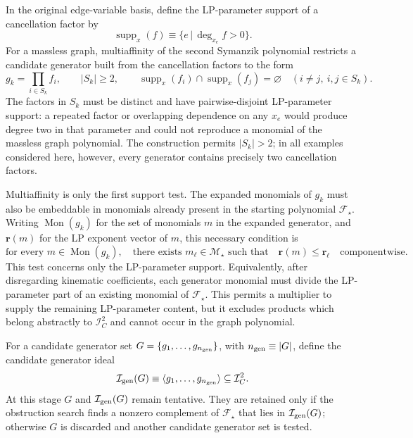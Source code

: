 \documentclass[a4paper,11pt]{article}
\newcommand{\ideal}{\mathcal I}
\begin{document}
In the original edge-variable basis, define the LP-parameter support of a
cancellation factor by
\begin{equation}
 \operatorname{supp}_{x}(f)
 \equiv\bigl\{e\,\big|\,\deg_{x_e}f>0\bigr\}.
 \label{eq:factor-x-support}
\end{equation}
For a massless graph, multiaffinity of the second Symanzik polynomial
restricts a candidate generator built from the cancellation factors to the
form
\begin{equation}
 g_k=\prod_{i\in S_k}f_i,
 \qquad |S_k|\geq2,
 \qquad
 \operatorname{supp}_{x}(f_i)
 \cap\operatorname{supp}_{x}(f_j)=\varnothing
 \quad (i\neq j,\ i,j\in S_k).
\label{eq:massless-generator}
\end{equation}
The factors in \(S_k\) must be distinct and have pairwise-disjoint
LP-parameter support: a repeated factor or overlapping dependence on any
\(x_e\) would produce degree two in that parameter and could not reproduce a
monomial of the massless graph polynomial.  The construction permits
\(|S_k|>2\); in all examples considered here, however, every generator
contains precisely two cancellation factors.

Multiaffinity is only the first support test.  The expanded monomials of
\(g_k\) must also be embeddable in monomials already present in the starting
polynomial \(\mathcal F_\star\).  Writing \(\operatorname{Mon}(g_k)\) for the
set of monomials \(m\) in the expanded generator, and \(\boldsymbol r(m)\) for
the LP exponent vector of \(m\), this necessary condition is
\begin{equation}
 \text{for every }m\in\operatorname{Mon}(g_k),\quad
 \text{there exists }m_\ell\in\mathcal M_\star\text{ such that}
 \quad \boldsymbol r(m)\leq\boldsymbol r_\ell
 \quad\text{componentwise}.
 \label{eq:generator-support}
\end{equation}
This test concerns only the LP-parameter support.  Equivalently, after
disregarding kinematic coefficients, each generator monomial must divide the
LP-parameter part of an existing monomial of \(\mathcal F_\star\).  This
permits a multiplier to supply the remaining LP-parameter content, but it
excludes products which belong abstractly to \(\ideal_C^2\) and cannot occur
in the graph polynomial.

For a candidate generator set
\(G=\{g_1,\ldots,g_{n_{\rm gen}}\}\), with
\(n_{\rm gen}\equiv |G|\), define the candidate generator ideal
\begin{equation}
 \mathcal I_{\rm gen}(G)\equiv
 \langle g_1,\ldots,g_{n_{\rm gen}}\rangle
 \subseteq\ideal_C^2.
 \label{eq:generator-ideal}
\end{equation}
At this stage \(G\) and \(\mathcal I_{\rm gen}(G)\) remain tentative.  They
are retained only if the obstruction search finds a nonzero complement of
\(\mathcal F_\star\) that lies in \(\mathcal I_{\rm gen}(G)\); otherwise
\(G\) is discarded and another candidate generator set is tested.
\end{document}
